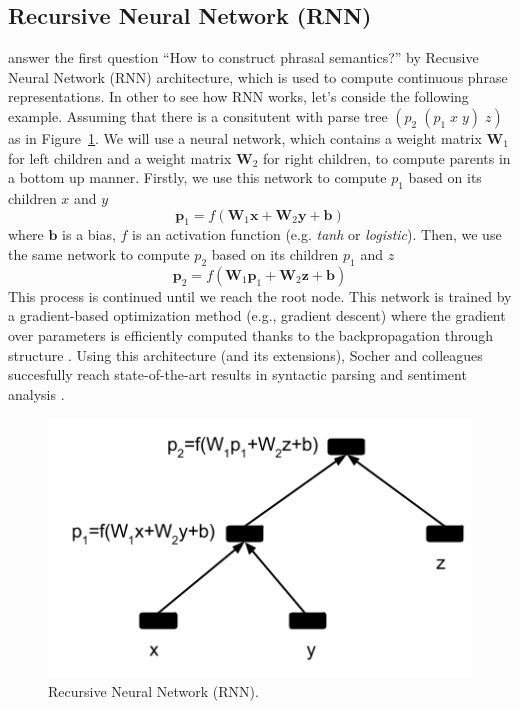 \documentclass[11pt]{article}
\begin{document}
\subsection{Recursive Neural Network (RNN)}
\label{subsection rnn}
\cite{socher_learning_2010} answer the first question ``How to construct phrasal semantics?'' 
by Recusive Neural Network (RNN) architecture, 
which is used to compute continuous phrase representations. In other to see how RNN works, 
let's conside the following example. Assuming that there is a consitutent with parse
tree $(p_2 \; (p_1 \; x \; y) \; z)$ as in Figure~\ref{figure rnn}. We will use a neural network, 
which contains a weight matrix $\mathbf{W}_1$ for left children and a weight matrix $\mathbf{W}_2$ 
for right children, to compute parents in a bottom up manner. Firstly, we use this network 
to compute $p_1$ based on its children $x$ and $y$
\begin{equation}
	\mathbf{p}_1 = f(\mathbf{W}_1 \mathbf{x} + \mathbf{W}_2 \mathbf{y} + \mathbf{b})
\end{equation}
where $\mathbf{b}$ is a bias, $f$ is an activation function (e.g. \textit{tanh} or \textit{logistic}).
Then, we use the same network to compute $p_2$ based on its children $p_1$ and $z$
\begin{equation}
	\mathbf{p}_2 = f(\mathbf{W}_1 \mathbf{p}_1 + \mathbf{W}_2 \mathbf{z} + \mathbf{b})
\end{equation}
This process is continued until we reach the root node.  This network is trained by 
a gradient-based optimization method (e.g., gradient descent) where the gradient 
over parameters is efficiently computed thanks to the backpropagation through structure
\cite{goller_learning_1996}. Using this architecture 
(and its extensions), Socher and colleagues succesfully reach 
state-of-the-art results in syntactic parsing \cite{socher2013parsing} and 
sentiment analysis \cite{socher2013recursive}. 
\begin{figure}[h!]
	\center
	\includegraphics[scale=0.5]{RNN.png}
	\caption{Recursive Neural Network (RNN).}
	\label{figure rnn}
\end{figure}
\end{document}
